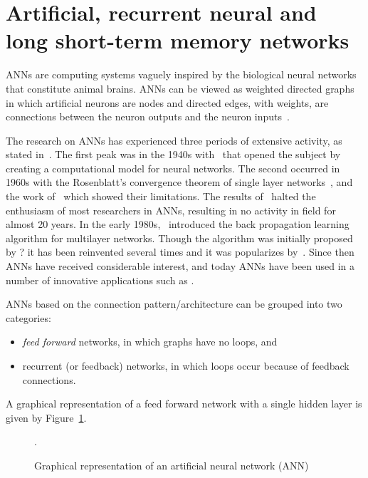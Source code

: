 \section{Artificial, recurrent neural and long short-term memory networks}\label{section:artificial_neural_networks}

ANNs are computing systems vaguely inspired by the
biological neural networks that constitute animal brains. ANNs can be viewed as
weighted directed graphs in which artificial neurons are nodes and directed
edges, with weights, are connections between the neuron outputs and the neuron
inputs~\cite{Jain1996}.

The research on ANNs has experienced three periods of extensive activity, as
stated in~\cite{Jain1996}. The first peak was in the 1940s
with~\cite{McCulloch1943} that opened the subject by creating a computational
model for neural networks. The second occurred in 1960s with the Rosenblatt's
convergence theorem of single layer networks~\cite{Rosenblatt1961}, and
the work of~\cite{Minsky1969} which showed their limitations.
The results of~\cite{Minsky1969} halted the enthusiasm of most
researchers in ANNs, resulting in no activity in field for almost 20 years. In
the early 1980s,~\cite{Werbos1974} introduced the back propagation learning
algorithm for multilayer networks. Though the algorithm was
initially proposed by ? it has been reinvented several times and it was
popularizes by~\cite{McClelland1986}. Since then ANNs have received considerable
interest, and today ANNs have been used in a number of innovative applications
such as \cite{Covington2016, Kalogirou2000}.

ANNs based on the connection pattern/architecture can be grouped into two
categories:

\begin{itemize}
    \item \textit{feed forward} networks, in which graphs have no loops, and
    \item recurrent (or feedback) networks, in which loops occur
    because of feedback connections.
\end{itemize}

A graphical representation of a feed forward network with a single hidden layer
is given by Figure~\ref{fig:ann}.

\begin{figure}[!htbp]
    \centering
    
    \caption{Graphical representation of an artificial neural network (ANN)}.\label{fig:ann}
\end{figure}

